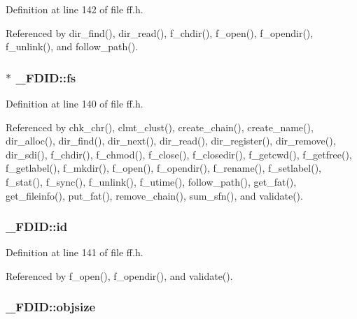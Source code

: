 Definition at line 142 of file ff.\+h.



Referenced by dir\+\_\+find(), dir\+\_\+read(), f\+\_\+chdir(), f\+\_\+open(), f\+\_\+opendir(), f\+\_\+unlink(), and follow\+\_\+path().

\subsubsection[{\texorpdfstring{fs}{fs}}]{$\ast$ \+\_\+\+F\+D\+I\+D\+::fs}\hypertarget{struct__FDID_aefa4597d88e54bace32e6c15e11d9610}{}\label{struct__FDID_aefa4597d88e54bace32e6c15e11d9610}


Definition at line 140 of file ff.\+h.



Referenced by chk\+\_\+chr(), clmt\+\_\+clust(), create\+\_\+chain(), create\+\_\+name(), dir\+\_\+alloc(), dir\+\_\+find(), dir\+\_\+next(), dir\+\_\+read(), dir\+\_\+register(), dir\+\_\+remove(), dir\+\_\+sdi(), f\+\_\+chdir(), f\+\_\+chmod(), f\+\_\+close(), f\+\_\+closedir(), f\+\_\+getcwd(), f\+\_\+getfree(), f\+\_\+getlabel(), f\+\_\+mkdir(), f\+\_\+open(), f\+\_\+opendir(), f\+\_\+rename(), f\+\_\+setlabel(), f\+\_\+stat(), f\+\_\+sync(), f\+\_\+unlink(), f\+\_\+utime(), follow\+\_\+path(), get\+\_\+fat(), get\+\_\+fileinfo(), put\+\_\+fat(), remove\+\_\+chain(), sum\+\_\+sfn(), and validate().

\subsubsection[{\texorpdfstring{id}{id}}]{ \+\_\+\+F\+D\+I\+D\+::id}\hypertarget{struct__FDID_a363d7bdab408418b911ac1502bc22ea6}{}\label{struct__FDID_a363d7bdab408418b911ac1502bc22ea6}


Definition at line 141 of file ff.\+h.



Referenced by f\+\_\+open(), f\+\_\+opendir(), and validate().

\subsubsection[{\texorpdfstring{objsize}{objsize}}]{ \+\_\+\+F\+D\+I\+D\+::objsize}\hypertarget{struct__FDID_a27039b8d89a4a62efabab36e6b303819}{}\label{struct__FDID_a27039b8d89a4a62efabab36e6b303819}


